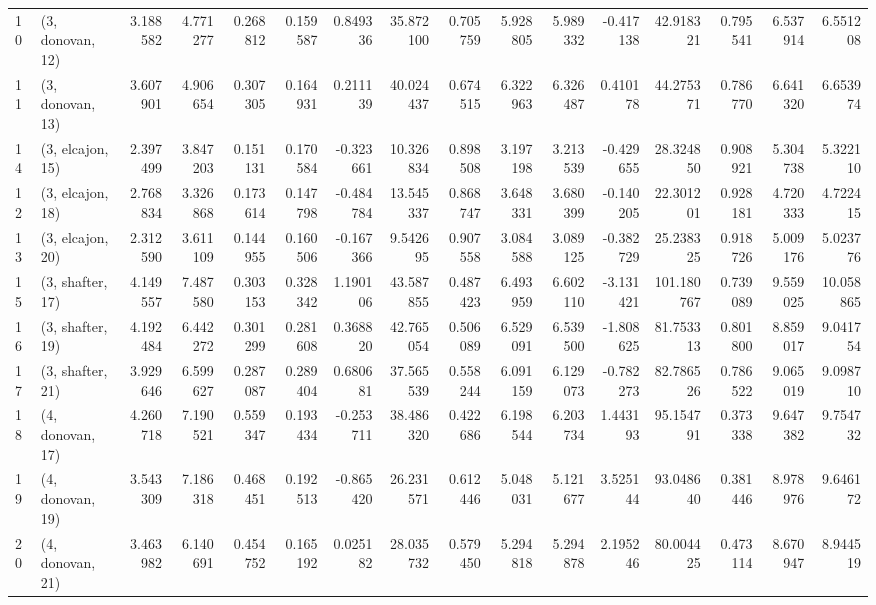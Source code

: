 \begin{tabular}{llrrrrrrrrrrrrrr}
10 &  (3, donovan, 12) &  3.188582 &   4.771277 &   0.268812 &  0.159587 &  0.849336 &  35.872100 &  0.705759 &   5.928805 &  5.989332 & -0.417138 &   42.918321 &  0.795541 &   6.537914 &   6.551208 \\
11 &  (3, donovan, 13) &  3.607901 &   4.906654 &   0.307305 &  0.164931 &  0.211139 &  40.024437 &  0.674515 &   6.322963 &  6.326487 &  0.410178 &   44.275371 &  0.786770 &   6.641320 &   6.653974 \\
14 &  (3, elcajon, 15) &  2.397499 &   3.847203 &   0.151131 &  0.170584 & -0.323661 &  10.326834 &  0.898508 &   3.197198 &  3.213539 & -0.429655 &   28.324850 &  0.908921 &   5.304738 &   5.322110 \\
12 &  (3, elcajon, 18) &  2.768834 &   3.326868 &   0.173614 &  0.147798 & -0.484784 &  13.545337 &  0.868747 &   3.648331 &  3.680399 & -0.140205 &   22.301201 &  0.928181 &   4.720333 &   4.722415 \\
13 &  (3, elcajon, 20) &  2.312590 &   3.611109 &   0.144955 &  0.160506 & -0.167366 &   9.542695 &  0.907558 &   3.084588 &  3.089125 & -0.382729 &   25.238325 &  0.918726 &   5.009176 &   5.023776 \\
15 &  (3, shafter, 17) &  4.149557 &   7.487580 &   0.303153 &  0.328342 &  1.190106 &  43.587855 &  0.487423 &   6.493959 &  6.602110 & -3.131421 &  101.180767 &  0.739089 &   9.559025 &  10.058865 \\
16 &  (3, shafter, 19) &  4.192484 &   6.442272 &   0.301299 &  0.281608 &  0.368820 &  42.765054 &  0.506089 &   6.529091 &  6.539500 & -1.808625 &   81.753313 &  0.801800 &   8.859017 &   9.041754 \\
17 &  (3, shafter, 21) &  3.929646 &   6.599627 &   0.287087 &  0.289404 &  0.680681 &  37.565539 &  0.558244 &   6.091159 &  6.129073 & -0.782273 &   82.786526 &  0.786522 &   9.065019 &   9.098710 \\
18 &  (4, donovan, 17) &  4.260718 &   7.190521 &   0.559347 &  0.193434 & -0.253711 &  38.486320 &  0.422686 &   6.198544 &  6.203734 &  1.443193 &   95.154791 &  0.373338 &   9.647382 &   9.754732 \\
19 &  (4, donovan, 19) &  3.543309 &   7.186318 &   0.468451 &  0.192513 & -0.865420 &  26.231571 &  0.612446 &   5.048031 &  5.121677 &  3.525144 &   93.048640 &  0.381446 &   8.978976 &   9.646172 \\
20 &  (4, donovan, 21) &  3.463982 &   6.140691 &   0.454752 &  0.165192 &  0.025182 &  28.035732 &  0.579450 &   5.294818 &  5.294878 &  2.195246 &   80.004425 &  0.473114 &   8.670947 &   8.944519 \\

\end{tabular}
